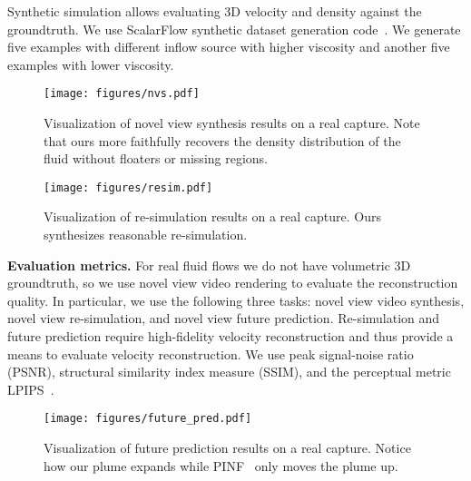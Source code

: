 \documentclass{article}
\newcommand{\myparagraph}[1]{\vspace{0.1cm}\noindent\textbf{#1}}
\begin{document}
Synthetic simulation allows evaluating 3D velocity and density against the groundtruth. We use ScalarFlow synthetic dataset generation code~\citep{eckert2019scalarflow}. We generate five examples with different inflow source with higher viscosity and another five examples with lower viscosity. 

\begin{figure}[t]
\centering
\texttt{[image: figures/nvs.pdf]}
\vspace{-0.05in}
\caption{Visualization of novel view synthesis results on a real capture. Note that ours more faithfully recovers the density distribution of the fluid without floaters or missing regions.}
\label{fig:nvs}
\end{figure} \begin{figure}[t]
\centering
\texttt{[image: figures/resim.pdf]}
\vspace{-0.05in}
\caption{Visualization of re-simulation results on a real capture. Ours synthesizes reasonable re-simulation.}
\vspace{-0.1in}
\label{fig:resim}
\end{figure} 
\myparagraph{Evaluation metrics.} For real fluid flows we do not have volumetric 3D groundtruth, so we use novel view video rendering to evaluate the reconstruction quality. In particular, we use the following three tasks: novel view video synthesis, novel view re-simulation, and novel view future prediction. Re-simulation and future prediction require high-fidelity velocity reconstruction and thus provide a means to evaluate velocity reconstruction. We use peak signal-noise ratio (PSNR), structural similarity index measure (SSIM), and the perceptual metric LPIPS~\citep{zhang2018unreasonable}.
\begin{figure}[t]
\centering
\texttt{[image: figures/future\_pred.pdf]}
\caption{Visualization of future prediction results on a real capture. Notice how our plume expands while PINF~\citep{chu2022physics} only moves the plume up.}
\label{fig:future_pred}
\end{figure} 
\end{document}
